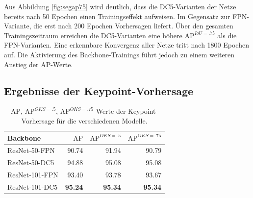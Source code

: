 Aus Abbildung \ref{fig:segap75} wird deutlich, dass die DC5-Varianten der Netze bereits nach 50 Epochen einen Trainingseffekt aufweisen. Im Gegensatz zur FPN-Variante, die erst nach 200 Epochen Vorhersagen liefert.  Über den gesamten Trainingszeitraum erreichen die DC5-Varianten eine höhere $\text{AP}^{IoU=.75}$ als die FPN-Varianten. Eine erkennbare Konvergenz aller Netze tritt nach 1800 Epochen auf. Die Aktivierung des Backbone-Trainings führt jedoch zu einem weiteren Anstieg der AP-Werte.


\subsection{Ergebnisse der Keypoint-Vorhersage}
\begin{table}[h]
\centering
\begin{tabular}{lrrr}
\toprule
Backbone & $\text{AP}$ & $\text{AP}^{OKS=.5}$ & $\text{AP}^{OKS=.75}$\\
\midrule
ResNet-50-FPN & 90.74 & 91.94 & 90.79 \\
ResNet-50-DC5 & 94.88 & 95.08 & 95.08\\
ResNet-101-FPN & 93.40 & 93.78 & 93.67\\
ResNet-101-DC5 & \textbf{95.24} & \textbf{95.34} & \textbf{95.34}\\
\bottomrule
\end{tabular}
\caption{$\text{AP}$, $\text{AP}^{OKS=.5}$, $\text{AP}^{OKS=.75}$ Werte der Keypoint-Vorhersage für die verschiedenen Modelle.}
\label{tab:keyap75}
\end{table}

